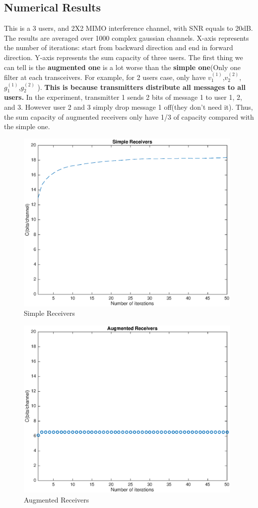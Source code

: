 \documentclass[11pt, oneside]{article}   	%
\begin{document}
\subsection{Numerical Results}
This is a 3 users, and 2X2 MIMO interference channel, with SNR equals to 20dB. The results are averaged over 1000 complex gaussian channels. X-axis represents the number of iterations: start from backward direction and end in forward direction. Y-axis represents the sum capacity of three users. The first thing we can tell is the \textbf{augmented one} is a lot worse than the \textbf{simple one}(Only one filter at each transceivers. For example, for 2 users case, only have $v^{(1)}_1$,$v^{(2)}_2$,$g^{(1)}_1$,$g^{(2)}_2$ ). \textbf{This is because transmitters distribute all messages to all users.} In the experiment, transmitter 1 sends 2 bits of message 1 to user 1, 2, and 3. However user 2 and 3 simply drop message 1 off(they don't need it). Thus, the sum capacity of augmented receivers only have 1/3 of capacity compared with the simple one.

 \begin{figure}[h]
    \centering
    \centerline{\includegraphics[width=110mm]{Simple_Receivers}}
    \caption{Simple Receivers}
\end{figure} 

\newpage

\begin{figure}[h]
    \centering
    \centerline{\includegraphics[width=110mm]{Augmented_Receivers}}
    \caption{Augmented Receivers}
\end{figure} 
\end{document}
